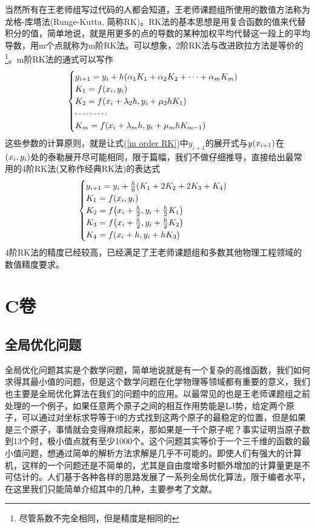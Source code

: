 \documentclass[12pt,a4paper,openany,twoside]{book}
\numberwithin{equation}{section}
\begin{document}
      当然所有在王老师组写过代码的人都会知道，王老师课题组所使用的数值方法称为龙格-库塔法(Runge-Kutta, 简称RK)。RK法的基本思想是用复合函数的值来代替积分的值，简单地说，就是用更多的点的导数的某种加权平均代替这一段上的平均导数，用m个点就称为m阶RK法。可以想象，2阶RK法与改进欧拉方法是等价的\footnote{尽管系数不完全相同，但是精度是相同的}。m阶RK法的通式可以写作
      \begin{equation}
        \begin{cases}
          y_{i+1}=y_i+h\qty(\alpha_1 K_1+\alpha_2 K_2+\cdots+\alpha_m K_m)\\
          K_1=f\qty(x_i, y_i)\\
          K_2=f\qty(x_i+\lambda_2 h, y_i+\mu_2 h K_1)\\
          \cdots\cdots\cdots\\
          K_m=f\qty(x_i+\lambda_m h, y_i+\mu_m h K_{m-1})
        \end{cases}
        \label{m order RK}
      \end{equation}
      这些参数的计算原则，就是让式(\ref{m order RK})中$y_{i+1}$的展开式与$y\qty(x_{i+1})$在$\qty(x_i,y_i)$处的泰勒展开尽可能相同，限于篇幅，我们不做仔细推导，直接给出最常用的4阶RK法(又称作经典RK法)的表达式
      \begin{equation}
        \begin{cases}
          y_{i+1}=y_i+\frac{h}{6}\qty(K_1+2K_2+2K_3+K_4)\\
          K_1=f\qty(x_i,y_i)\\
          K_2=f\qty(x_i+\frac{h}{2},y_i+\frac{h}{2}K_1) \\
          K_3=f\qty(x_i+\frac{h}{2},y_i+\frac{h}{2}K_2) \\
          K_4=f\qty(x_i+h, y_i+hK_3)
        \end{cases}
        \label{4 order RK}
      \end{equation}
      4阶RK法的精度已经较高，已经满足了王老师课题组和多数其他物理工程领域的数值精度要求。


    \part{C卷}
    \chapter{全局优化问题}
      全局优化问题其实是个数学问题，简单地说就是有一个复杂的高维函数，我们如何求得其最小值的问题，但是这个数学问题在化学物理等领域都有重要的意义，我们也主要是全局优化算法在我们的问题中的应用。以最常见的也是王老师课题组之前处理的一个例子，如果任意两个原子之间的相互作用势能是LJ势，给定两个原子，可以通过对坐标求导等于0的方式找到这两个原子的最稳定的位置，但是如果是三个原子，事情就会变得麻烦起来，那如果是一千个原子呢？事实证明当原子数到13个时，极小值点就有至少1000个。这个问题其实等价于一个三千维的函数的最小值问题，想通过简单的解析方法求解是几乎不可能的。即使人们有强大的计算机，这样的一个问题还是不简单的，尤其是自由度增多时额外增加的计算量更是不可估计的。人们基于各种各样的思路发展了一系列全局优化算法，限于编者水平，在这里我们只能简单介绍其中的几种，主要参考了文献\cite{Kaplan2006}\cite{卡普兰2013分子间相互作用}。
\end{document}
